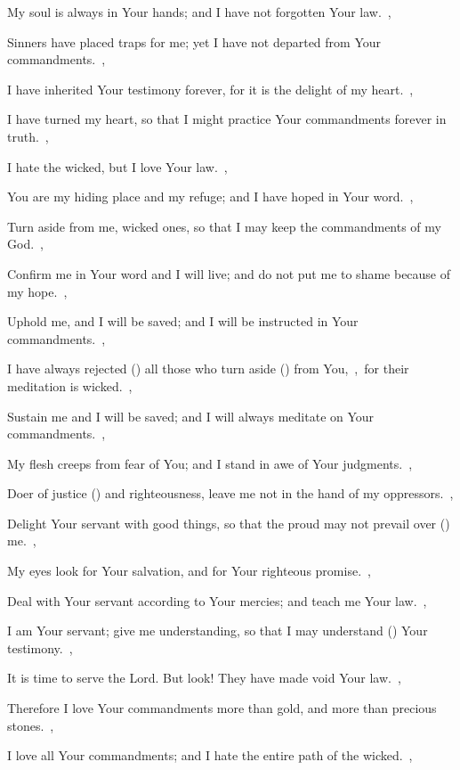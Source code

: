 \documentclass[12pt,twoside,a5paper]{article}
\begin{document}
\begin{halfparskip}
  My soul is always in Your hands; and I have not forgotten Your law.~\sep

  Sinners have placed traps for me; yet I have not departed from Your commandments.~\sep

  I have inherited Your testimony forever, for it is the delight of my heart.~\sep

  I have turned my heart, so that I might practice Your commandments forever in truth.~\sep

   I hate the wicked, but I love Your law.~\sep

  You are my hiding place and my refuge; and I have hoped in Your word.~\sep

  Turn aside from me, wicked ones, so that I may keep the commandments of my God.~\sep

  Confirm me in Your word and I will live; and do not put me to shame because of my hope.~\sep

  Uphold me, and I will be saved; and I will be instructed in Your commandments.~\sep

  I have always rejected () all those who turn aside () from You,~\sep\ for their meditation is wicked.~\sep

  Sustain me and I will be saved; and I will always meditate on Your commandments.~\sep

  My flesh creeps from fear of You; and I stand in awe of Your judgments.~\sep

   Doer of justice () and righteousness, leave me not in the hand of my oppressors.~\sep

  Delight Your servant with good things, so that the proud may not prevail over () me.~\sep

  My eyes look for Your salvation, and for Your righteous promise.~\sep

  Deal with Your servant according to Your mercies; and teach me Your law.~\sep

  I am Your servant; give me understanding, so that I may understand () Your testimony.~\sep

  It is time to serve the Lord. But look! They have made void Your law.~\sep

  Therefore I love Your commandments more than gold, and more than precious stones.~\sep

  I love all Your commandments; and I hate the entire path of the wicked.~\sep


\end{halfparskip}
\end{document}

